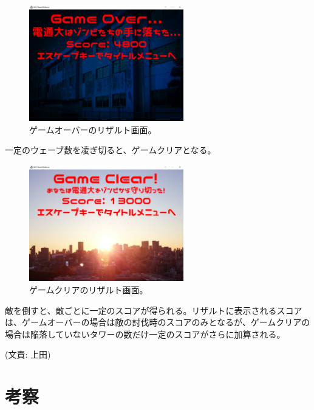 \documentclass[11pt,a4j]{jarticle}
\begin{document}
\begin{figure}[H]
    \begin{center}
        \leavevmode
        \includegraphics[width=0.6\textwidth]{gameover.png}
        \caption{ゲームオーバーのリザルト画面。}
        \label{fig:gameover}
    \end{center}
\end{figure}

一定のウェーブ数を凌ぎ切ると、ゲームクリアとなる。

\begin{figure}[H]
    \begin{center}
        \leavevmode
        \includegraphics[width=0.6\textwidth]{gameclear.png}
        \caption{ゲームクリアのリザルト画面。}
        \label{fig:gameclear}
    \end{center}
\end{figure}

敵を倒すと、敵ごとに一定のスコアが得られる。リザルトに表示されるスコアは、ゲームオーバーの場合は敵の討伐時のスコアのみとなるが、ゲームクリアの場合は陥落していないタワーの数だけ一定のスコアがさらに加算される。

(文責: 上田)

\section{考察}
\end{document}
